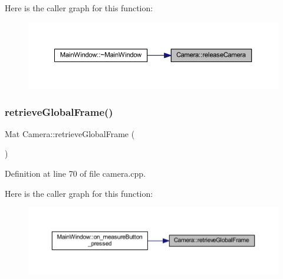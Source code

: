 Here is the caller graph for this function\+:
\nopagebreak
\begin{figure}[H]
\begin{center}
\leavevmode
\includegraphics[width=350pt]{classCamera_a08ea14c11fdb3be4a43d84db0bd1f9e5_icgraph}
\end{center}
\end{figure}
\mbox{\label{classCamera_a588c762e434d64ad0b515576436603cf}} 
\subsubsection{\texorpdfstring{retrieveGlobalFrame()}{retrieveGlobalFrame()}}
{\footnotesize\ttfamily Mat Camera\+::retrieve\+Global\+Frame (\begin{DoxyParamCaption}{ }\end{DoxyParamCaption})}



Definition at line 70 of file camera.\+cpp.

Here is the caller graph for this function\+:
\nopagebreak
\begin{figure}[H]
\begin{center}
\leavevmode
\includegraphics[width=350pt]{classCamera_a588c762e434d64ad0b515576436603cf_icgraph}
\end{center}
\end{figure}
\mbox{\label{classCamera_a9b9c3210f57f3646f19e31904d5a0544}} 
